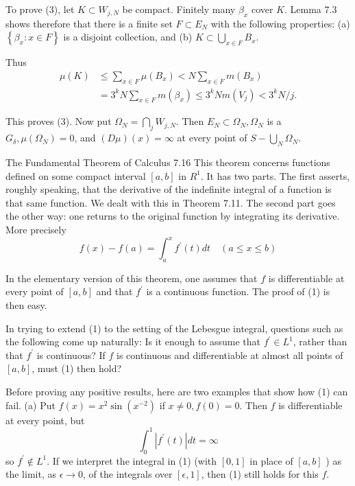 To prove (3), let $K \subset W_{j, N}$ be compact. Finitely many $\beta_x$ cover $K$. Lemma 7.3 shows therefore that there is a finite set $F \subset E_N$ with the following properties:
(a) $\left\{\beta_x: x \in F\right\}$ is a disjoint collection, and
(b) $K \subset \bigcup_{x \in F} B_x$.

Thus
$$
\begin{aligned}
\mu(K) & \leq \sum_{x \in F} \mu\left(B_x\right)<N \sum_{x \in F} m\left(B_x\right) \\
& =3^k N \sum_{x \in F} m\left(\beta_x\right) \leq 3^k N m\left(V_j\right)<3^k N / j .
\end{aligned}
$$

This proves (3).
Now put $\Omega_N=\bigcap_j W_{j, N}$. Then $E_N \subset \Omega_N, \Omega_N$ is a $G_\delta, \mu\left(\Omega_N\right)=0$, and $(D \mu)(x)=\infty$ at every point of $S-\bigcup_N \Omega_N$.


The Fundamental Theorem of Calculus
7.16 This theorem concerns functions defined on some compact interval $[a, b]$ in $R^1$. It has two parts. The first asserts, roughly speaking, that the derivative of the indefinite integral of a function is that same function. We dealt with this in Theorem 7.11. The second part goes the other way: one returns to the original function by integrating its derivative. More precisely
$$
f(x)-f(a)=\int_a^x f^{\prime}(t) d t \quad(a \leq x \leq b)
$$

In the elementary version of this theorem, one assumes that $f$ is differentiable at every point of $[a, b]$ and that $f^{\prime}$ is a continuous function. The proof of (1) is then easy.

In trying to extend (1) to the setting of the Lebesgue integral, questions such as the following come up naturally:
Is it enough to assume that $f^{\prime} \in L^1$, rather than that $f^{\prime}$ is continuous?
If $f$ is continuous and differentiable at almost all points of $[a, b]$, must (1) then hold?

Before proving any positive results, here are two examples that show how (1) can fail.
(a) Put $f(x)=x^2 \sin \left(x^{-2}\right)$ if $x \neq 0, f(0)=0$. Then $f$ is differentiable at every point, but
$$
\int_0^1\left|f^{\prime}(t)\right| d t=\infty
$$
so $f^{\prime} \notin L^1$.
If we interpret the integral in (1) (with $[0,1]$ in place of $[a, b]$ ) as the limit, as $\epsilon \rightarrow 0$, of the integrals over $[\epsilon, 1]$, then (1) still holds for this $f$.

